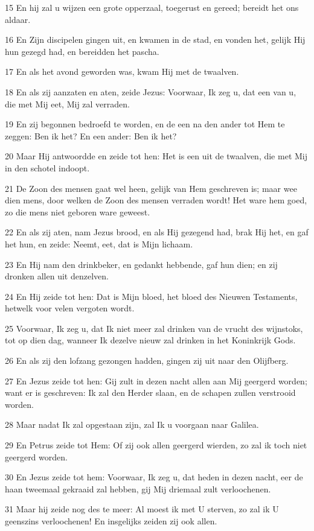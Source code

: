\par 15 En hij zal u wijzen een grote opperzaal, toegerust en gereed; bereidt het ons aldaar.
\par 16 En Zijn discipelen gingen uit, en kwamen in de stad, en vonden het, gelijk Hij hun gezegd had, en bereidden het pascha.
\par 17 En als het avond geworden was, kwam Hij met de twaalven.
\par 18 En als zij aanzaten en aten, zeide Jezus: Voorwaar, Ik zeg u, dat een van u, die met Mij eet, Mij zal verraden.
\par 19 En zij begonnen bedroefd te worden, en de een na den ander tot Hem te zeggen: Ben ik het? En een ander: Ben ik het?
\par 20 Maar Hij antwoordde en zeide tot hen: Het is een uit de twaalven, die met Mij in den schotel indoopt.
\par 21 De Zoon des mensen gaat wel heen, gelijk van Hem geschreven is; maar wee dien mens, door welken de Zoon des mensen verraden wordt! Het ware hem goed, zo die mens niet geboren ware geweest.
\par 22 En als zij aten, nam Jezus brood, en als Hij gezegend had, brak Hij het, en gaf het hun, en zeide: Neemt, eet, dat is Mijn lichaam.
\par 23 En Hij nam den drinkbeker, en gedankt hebbende, gaf hun dien; en zij dronken allen uit denzelven.
\par 24 En Hij zeide tot hen: Dat is Mijn bloed, het bloed des Nieuwen Testaments, hetwelk voor velen vergoten wordt.
\par 25 Voorwaar, Ik zeg u, dat Ik niet meer zal drinken van de vrucht des wijnstoks, tot op dien dag, wanneer Ik dezelve nieuw zal drinken in het Koninkrijk Gods.
\par 26 En als zij den lofzang gezongen hadden, gingen zij uit naar den Olijfberg.
\par 27 En Jezus zeide tot hen: Gij zult in dezen nacht allen aan Mij geergerd worden; want er is geschreven: Ik zal den Herder slaan, en de schapen zullen verstrooid worden.
\par 28 Maar nadat Ik zal opgestaan zijn, zal Ik u voorgaan naar Galilea.
\par 29 En Petrus zeide tot Hem: Of zij ook allen geergerd wierden, zo zal ik toch niet geergerd worden.
\par 30 En Jezus zeide tot hem: Voorwaar, Ik zeg u, dat heden in dezen nacht, eer de haan tweemaal gekraaid zal hebben, gij Mij driemaal zult verloochenen.
\par 31 Maar hij zeide nog des te meer: Al moest ik met U sterven, zo zal ik U geenszins verloochenen! En insgelijks zeiden zij ook allen.

